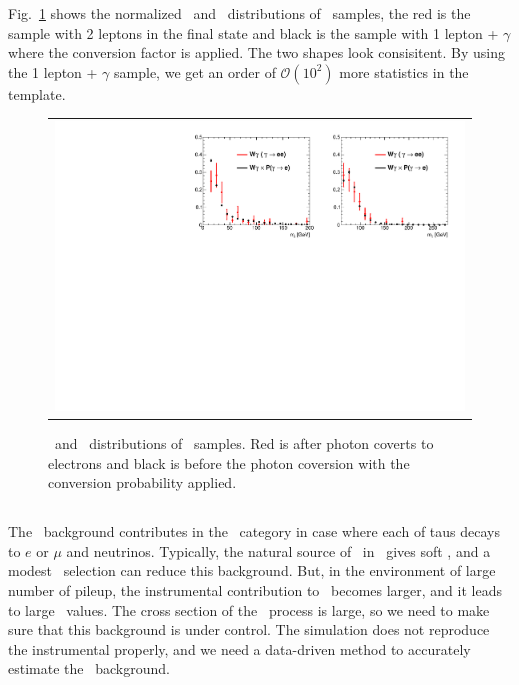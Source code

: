 Fig.~\ref{fig:wgamma_compare} shows the normalized \mll\ and \mt\ distributions 
of \wgamma\ samples, the red is the sample with 2 leptons in the final state 
and black is the sample with 1 lepton + $\gamma$ where the conversion 
factor is applied. The two shapes look consisitent. 
By using the 1 lepton + $\gamma$ sample, we get an order of $\mathcal{O}(10^2)$ 
more statistics in the template.  
\begin{figure}[htp] 
\centering 
\begin{tabular}{c} 
\includegraphics[width=1.0\textwidth]{figures/Wgamma_0j_of.pdf} 
\end{tabular} 
\caption{\mll\ and \mt\ distributions of \wgamma\ samples. 
Red is after photon coverts to electrons and black is before the photon coversion 
with the conversion probability applied. }
\label{fig:wgamma_compare} 
\end{figure}  



\subsection{\ztt}

The \ztt\ background contributes in the \DF\ category in case where 
each of taus decays to $e$ or $\mu$ and neutrinos. Typically, the natural source 
of \met\ in \ztt\ gives soft \met, and a modest \met\ selection can  
reduce this background. But, in the environment of large number of pileup, 
the instrumental contribution to \met\ becomes larger, and it leads to large 
\met\ values. The cross section of the \ztt\ process is large, so we need to make 
sure that this background is under control. The simulation does not reproduce 
the instrumental \met properly, and we need a data-driven method to 
accurately estimate the \ztt\ background. 

